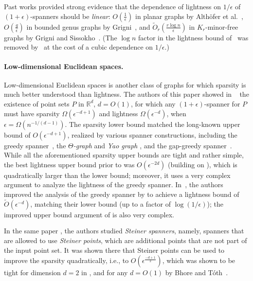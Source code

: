 Past works provided strong evidence that the dependence of lightness on $1/\epsilon$ of $(1+\epsilon)$-spanners
should be \emph{linear}: $O(\frac{1}{\epsilon})$ in planar graphs by Alth\"{o}fer et al.~\cite{ADDJS93}, 
$O(\frac{g}{\epsilon})$ in bounded genus graphs by Grigni~\cite{Grigni00}, and $\tilde{O}_{r}(\frac{r \log n}{\epsilon})$ in $K_r$-minor-free graphs by Grigni and Sissokho~\cite{GS02}. (The $\log n$ factor in the lightness bound of~\cite{GS02} was removed by~\cite{BLW17} at the cost of a cubic dependence on $1/\epsilon$.) 

\paragraph{Low-dimensional Euclidean spaces.~}
Low-dimensional Euclidean spaces is another class of graphs for which sparsity is much better understood than lightness. The authors of this paper showed in ~\cite{LS19} the existence of point sets $P$ in $\mathbb{R}^d$, $d = O(1)$, for which any $(1+\epsilon)$-spanner for $P$ must have sparsity $\Omega(\epsilon^{-d+1})$ and lightness $\Omega(\epsilon^{-d})$, when  $\epsilon = \Omega(n^{-1/(d-1)})$. The sparsity lower bound matched the long-known upper bound of $O(\epsilon^{-d+1})$, realized by various spanner constructions, including the greedy spanner~\cite{ADDJS93,CDNS92,NS07}, the {\em $\Theta$-graph} and {\em Yao graph} \cite{Yao82, Clarkson87,Keil88,KG92,RS91,ADDJS93}, and the gap-greedy spanner~\cite{Salowe92,AS97}.
While all the aforementioned sparsity upper bounds are tight and rather simple,  the best lightness upper bound prior to \cite{LS19} was $O(\epsilon^{-2d})$ \cite{NS07} (building on \cite{ADDJS93,DHN93,DNS95,RS98}), 
which is quadratically larger than the lower bound; moreover, it uses a very complex argument to analyze the lightness of the greedy spanner. In~\cite{LS19}, the authors improved the analysis of the greedy spanner by \cite{NS07} to achieve a lightness bound of $\tilde{O}(\epsilon^{-d})$,
matching their lower bound (up to a factor of $\log(1/\epsilon)$); the improved upper bound argument of \cite{LS19} is also very complex.
  
In the same paper \cite{LS19}, the authors studied {\em Steiner spanners}, namely, spanners that are allowed to use 
{\em Steiner points}, which are additional points that are not part of the input point set.
It was shown there that Steiner points can be used to improve the sparsity quadratically, i.e., to $O(\epsilon^{\frac{-d+1}{2}})$,
which was shown to be tight for dimension $d = 2$ in \cite{LS19}, and for any $d = O(1)$ by Bhore and T\'{o}th~\cite{BT21B}.

